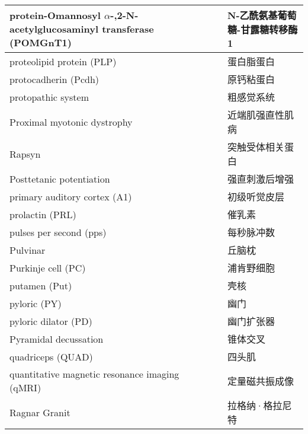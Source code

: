 \begin{longtable}{lll}
	\midrule
	protein-Omannosyl $\alpha$-,2-N-acetylglucosaminyl transferase (POMGnT1)     && N-乙酰氨基葡萄糖-甘露糖转移酶1  \\
	
	\midrule
	proteolipid protein (PLP)   && 蛋白脂蛋白  \\
	
	\midrule
	protocadherin (Pcdh)  && 原钙粘蛋白  \\
	
	\midrule
	protopathic system   && 粗感觉系统  \\
	
	\midrule
	Proximal myotonic dystrophy   && 近端肌强直性肌病  \\
	
	\midrule
	Rapsyn   && 突触受体相关蛋白  \\
	
	\midrule
	Posttetanic potentiation   && 强直刺激后增强  \\
	
	\midrule
	primary auditory cortex (A1)   && 初级听觉皮层  \\
	
	\midrule
	prolactin  (PRL)  && 催乳素  \\
	
	\midrule
	pulses per second (pps)  && 每秒脉冲数  \\
	
	\midrule
	Pulvinar   && 丘脑枕  \\
	
	\midrule
	Purkinje cell (PC)   && 浦肯野细胞  \\
	
	\midrule
	putamen (Put)   && 壳核  \\
	
	\midrule
	pyloric (PY)  && 幽门  \\
	
	\midrule
	pyloric dilator (PD)  && 幽门扩张器  \\
	
	\midrule
	Pyramidal decussation   && 锥体交叉  \\
	
	\midrule
	quadriceps (QUAD)   && 四头肌  \\
	
	\midrule
	quantitative magnetic resonance imaging (qMRI) && 定量磁共振成像  \\
	
	\midrule
	Ragnar Granit   && 拉格纳·格拉尼特  \\
	

\end{longtable}
